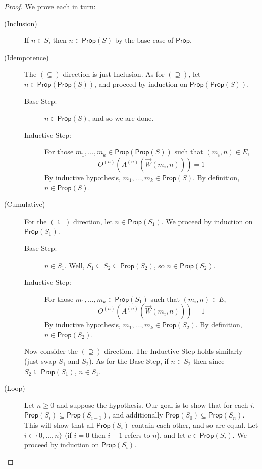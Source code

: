 \documentclass[letterpaper]{article}
\theoremstyle{definition}
\newcommand{\set}[1]{\{ #1 \}}
\newcommand{\Prop}{\textsf{Prop}}
\begin{document}
\begin{proof} We prove each in turn:
\begin{description}
    \item[(Inclusion)] If $n \in S$, then $n \in \Prop(S)$ by the base case of $\Prop$.
    
    
    \item[(Idempotence)] The $(\subseteq)$ direction is just Inclusion.  As for $(\supseteq)$, let $n \in \Prop(\Prop(S))$, and proceed by induction on $\Prop(\Prop(S))$.
    
    \begin{description}
    \item[Base Step:] $n \in \Prop(S)$, and so we are done.
    
    \item[Inductive Step:] For those $m_1, \ldots, m_k \in \Prop(\Prop(S))$ such that $(m_i, n) \in E$,
    \[
    O^{(n)}(A^{(n)}(\overrightarrow{W}(m_i, n))) = 1
    \]
    By inductive hypothesis, $m_1, \ldots, m_k \in \Prop(S)$.  By definition, $n \in \Prop(S)$.
    \end{description}
    
    
    \item[(Cumulative)] For the $(\subseteq)$ direction, let $n \in \Prop(S_1)$.  We proceed by induction on $\Prop(S_1)$.
    
    \begin{description}
    \item[Base Step:] $n \in S_1$.  Well, $S_1 \subseteq S_2 \subseteq \Prop(S_2)$, so $n \in \Prop(S_2)$.
    
    \item[Inductive Step:] For those $m_1, \ldots, m_k \in \Prop(S_1)$ such that $(m_i, n) \in E$,
    \[
    O^{(n)}(A^{(n)}(\overrightarrow{W}(m_i, n))) = 1
    \]
    By inductive hypothesis, $m_1, \ldots, m_k \in \Prop(S_2)$.  By definition, $n \in \Prop(S_2)$.
    \end{description}
    
    Now consider the $(\supseteq)$ direction.  The Inductive Step holds similarly (just swap $S_1$ and $S_2$).  As for the Base Step, if $n \in S_2$ then since $S_2 \subseteq \Prop(S_1)$, $n \in S_1$.
    
    
    \item[(Loop)] Let $n \geq 0$ and suppose the hypothesis.  Our goal is to show that for each $i$, $\Prop(S_i) \subseteq \Prop(S_{i-1})$, and additionally $\Prop(S_0) \subseteq \Prop(S_n)$.  This will show that all $\Prop(S_i)$ contain each other, and so are equal.  Let $i \in \set{0, \ldots, n}$ (if $i = 0$ then $i-1$ refers to $n$), and let $e \in \Prop(S_i)$.  We proceed by induction on $\Prop(S_i)$.
    

\end{description}
\end{proof}
\end{document}
